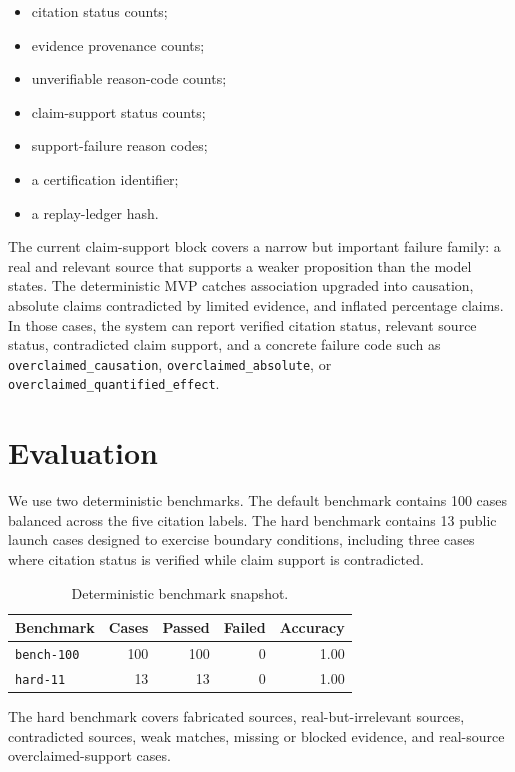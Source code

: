 \documentclass[11pt]{article}
\begin{document}
\begin{itemize}[leftmargin=*]
  \item citation status counts;
  \item evidence provenance counts;
  \item unverifiable reason-code counts;
  \item claim-support status counts;
  \item support-failure reason codes;
  \item a certification identifier;
  \item a replay-ledger hash.
\end{itemize}

The current claim-support block covers a narrow but important failure family: a real and relevant source that supports a weaker proposition than the model states. The deterministic MVP catches association upgraded into causation, absolute claims contradicted by limited evidence, and inflated percentage claims. In those cases, the system can report verified citation status, relevant source status, contradicted claim support, and a concrete failure code such as \texttt{overclaimed\_causation}, \texttt{overclaimed\_absolute}, or \texttt{overclaimed\_quantified\_effect}.

\section{Evaluation}

We use two deterministic benchmarks. The default benchmark contains 100 cases balanced across the five citation labels. The hard benchmark contains 13 public launch cases designed to exercise boundary conditions, including three cases where citation status is verified while claim support is contradicted.

\begin{table}[h]
\centering
\small
\begin{tabularx}{\columnwidth}{Xrrrr}
\toprule
Benchmark & Cases & Passed & Failed & Accuracy \\
\midrule
\texttt{bench-100} & 100 & 100 & 0 & 1.00 \\
\texttt{hard-11} & 13 & 13 & 0 & 1.00 \\
\bottomrule
\end{tabularx}
\caption{Deterministic benchmark snapshot.}
\label{tab:benchmarks}
\end{table}

The hard benchmark covers fabricated sources, real-but-irrelevant sources, contradicted sources, weak matches, missing or blocked evidence, and real-source overclaimed-support cases.
\end{document}
